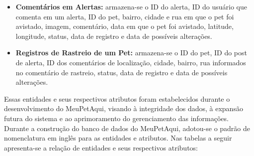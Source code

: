 \begin{itemize}
\item \textbf{Comentários em Alertas:} armazena-se o ID do alerta, ID do usuário que comenta em um alerta, ID do pet, bairro, cidade e rua em que o pet foi avistado, imagem, comentário, data em que o pet foi avistado, latitude, longitude, status, data de registro e data de possíveis alterações.

\item \textbf{Registros de Rastreio de um Pet:} armazena-se o ID do pet, ID do post de alerta, ID dos comentários de localização, cidade, bairro, rua informados no comentário de rastreio, status, data de registro e data de possíveis alterações.
\end{itemize}

Essas entidades e seus respectivos atributos foram estabelecidos durante o desenvolvimento do MeuPetAqui, visando à integridade dos dados, à expansão futura do sistema e ao aprimoramento do gerenciamento das informações. Durante a construção do banco de dados do MeuPetAqui, adotou-se o padrão de nomenclatura em inglês para as entidades e atributos. Nas tabelas a seguir apresenta-se a relação de entidades e seus respectivos atributos:

